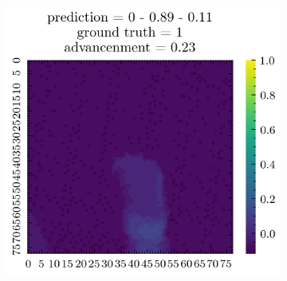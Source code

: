 \begin{figure}[H]
\begin{subfigure}[b]{0.19\textwidth}
    \end{subfigure}  
    \begin{subfigure}[b]{0.19\textwidth}
        \includegraphics[width=\linewidth]{../img/5/quarry/false_positive/patch-2d-4.png}
    \end{subfigure}  


\end{figure}
